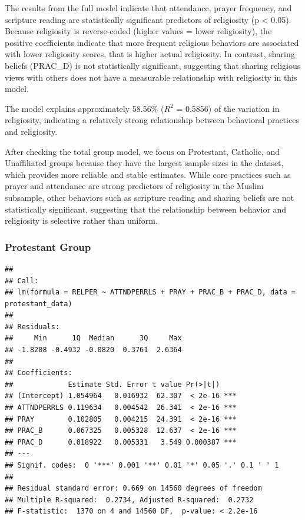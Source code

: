 \documentclass[
]{article}
\begin{document}
The results from the full model indicate that attendance, prayer
frequency, and scripture reading are statistically significant
predictors of religiosity (p \textless{} 0.05). Because religiosity is
reverse-coded (higher values = lower religiosity), the positive
coefficients indicate that more frequent religious behaviors are
associated with lower religiosity scores, that is higher actual
religiosity. In contrast, sharing beliefs (PRAC\_D) is not statistically
significant, suggesting that sharing religious views with others does
not have a measurable relationship with religiosity in this model.

The model explains approximately 58.56\% (\(R^2\) = 0.5856) of the
variation in religiosity, indicating a relatively strong relationship
between behavioral practices and religiosity.

After checking the total group model, we focus on Protestant, Catholic,
and Unaffiliated groups because they have the largest sample sizes in
the dataset, which provides more reliable and stable estimates. While
core practices such as prayer and attendance are strong predictors of
religiosity in the Muslim subsample, other behaviors such as scripture
reading and sharing beliefs are not statistically significant,
suggesting that the relationship between behavior and religiosity is
selective rather than uniform.

\subsubsection{Protestant Group}\label{protestant-group}

\begin{verbatim}
## 
## Call:
## lm(formula = RELPER ~ ATTNDPERRLS + PRAY + PRAC_B + PRAC_D, data = protestant_data)
## 
## Residuals:
##     Min      1Q  Median      3Q     Max 
## -1.8208 -0.4932 -0.0820  0.3761  2.6364 
## 
## Coefficients:
##             Estimate Std. Error t value Pr(>|t|)    
## (Intercept) 1.054964   0.016932  62.307  < 2e-16 ***
## ATTNDPERRLS 0.119634   0.004542  26.341  < 2e-16 ***
## PRAY        0.102805   0.004215  24.391  < 2e-16 ***
## PRAC_B      0.067325   0.005328  12.637  < 2e-16 ***
## PRAC_D      0.018922   0.005331   3.549 0.000387 ***
## ---
## Signif. codes:  0 '***' 0.001 '**' 0.01 '*' 0.05 '.' 0.1 ' ' 1
## 
## Residual standard error: 0.669 on 14560 degrees of freedom
## Multiple R-squared:  0.2734, Adjusted R-squared:  0.2732 
## F-statistic:  1370 on 4 and 14560 DF,  p-value: < 2.2e-16
\end{verbatim}
\end{document}
